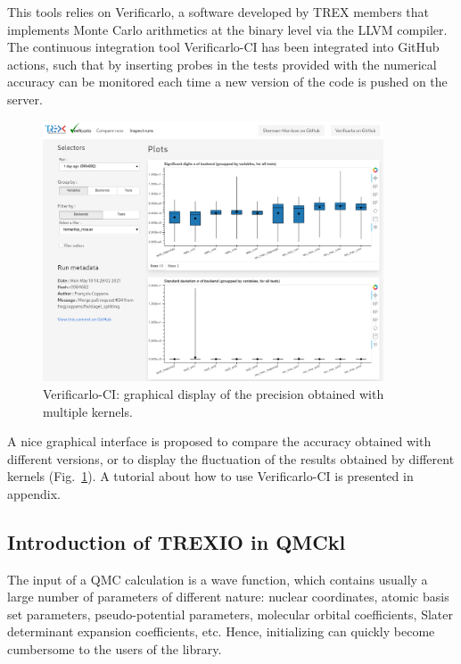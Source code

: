 This tools relies on Verificarlo,\cite{verificarlo} a software
developed by TREX members that implements Monte Carlo arithmetics at
the binary level via the LLVM compiler. The continuous integration
tool Verificarlo-CI has been integrated into GitHub actions, such that
by inserting probes in the tests provided with \QMCkl{} the numerical
accuracy can be monitored each time a new version of the code is
pushed on the server.

\begin{figure}
\centering
  \includegraphics[width=0.9\textwidth]{images/inspect_runs.png}
  \caption{Verificarlo-CI: graphical display of the precision obtained
    with multiple kernels.}
    \label{fig:vfci}
\end{figure}
A nice graphical interface is proposed to compare the accuracy
obtained with different versions, or to display the fluctuation of
the results obtained by different kernels (Fig.~\ref{fig:vfci}).
A tutorial about how to use Verificarlo-CI is presented in appendix.

\subsection{Introduction of TREXIO in QMCkl}

The input of a \ac{QMC} calculation is a wave function, which
contains usually a large number of parameters of different nature:
nuclear coordinates, atomic basis set parameters, pseudo-potential
parameters, molecular orbital coefficients, Slater determinant
expansion coefficients, etc.
Hence, initializing \QMCkl{} can quickly become cumbersome to the users
of the library.

